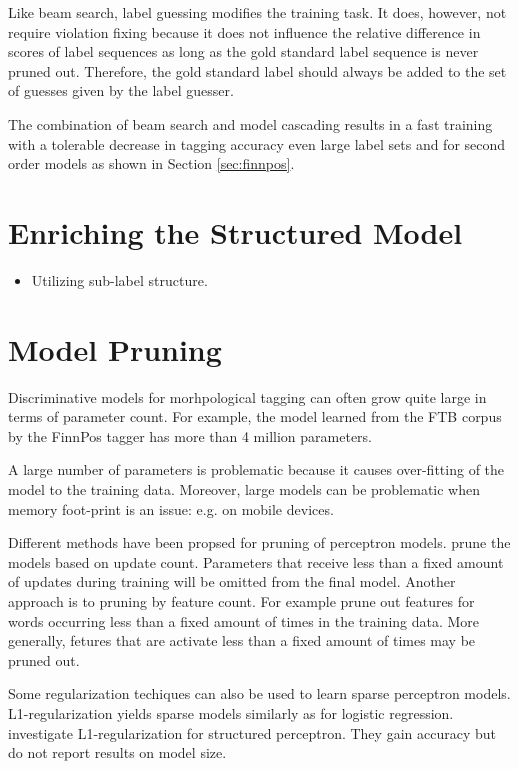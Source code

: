Like beam search, label guessing modifies the training task. It does,
however, not require violation fixing because it does not influence
the relative difference in scores of label sequences as long as the
gold standard label sequence is never pruned out. Therefore, the gold
standard label should always be added to the set of guesses given by
the label guesser.

The combination of beam search and model cascading results in a fast
training with a tolerable decrease in tagging accuracy even large
label sets and for second order models as shown in Section
\ref{sec:finnpos}.

\section{Enriching the Structured Model}\label{sec:sub-labels}
\begin{itemize}
\item Utilizing sub-label structure.
\end{itemize}

\section{Model Pruning}\label{sec:pruning}

Discriminative models for morhpological tagging can often grow quite
large in terms of parameter count. For example, the model learned from
the FTB corpus by the FinnPos tagger has more than 4 million
parameters.

A large number of parameters is problematic because it causes
over-fitting of the model to the training data. Moreover, large models
can be problematic when memory foot-print is an issue: e.g. on mobile
devices.

Different methods have been propsed for pruning of perceptron
models. \cite{Goldberg2011} prune the models based on update
count. Parameters that receive less than a fixed amount of updates
during training will be omitted from the final model. Another approach
is to pruning by feature count. For example \cite{Hulden2013} prune
out features for words occurring less than a fixed amount of times in
the training data. More generally, fetures that are activate less than
a fixed amount of times may be pruned out. 

Some regularization techiques can also be used to learn sparse
perceptron models. L1-regularization yields sparse models similarly as
for logistic regression. \cite{Zhang2014} investigate
L1-regularization for structured perceptron. They gain accuracy but do
not report results on model size.


